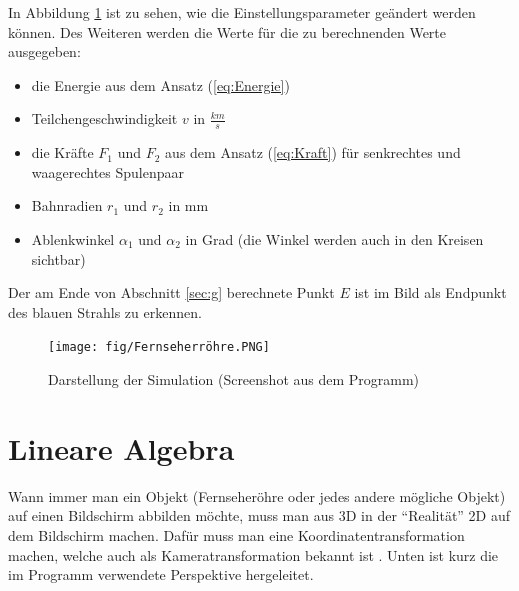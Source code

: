 In Abbildung \ref{fig:meineSimulation} ist zu sehen, wie die Einstellungsparameter geändert werden können. 
Des Weiteren werden die Werte für die zu berechnenden Werte ausgegeben:
\begin{itemize}
    \item die Energie aus dem Ansatz (\ref{eq:Energie})
    \item Teilchengeschwindigkeit $v$ in $\frac{km}{s}$
    \item die Kräfte $F_1$ und $F_2$ aus dem Ansatz (\ref{eq:Kraft}) für senkrechtes und waagerechtes Spulenpaar
    \item Bahnradien $r_1$ und $r_2$ in mm 
    \item Ablenkwinkel $\alpha_1$ und $\alpha_2$ in Grad (die Winkel werden auch in den Kreisen sichtbar)
\end{itemize}
Der am Ende von Abschnitt \ref{sec:g} berechnete Punkt $E$ ist im Bild als Endpunkt des blauen Strahls zu erkennen.

\begin{figure}[h]
    \centering
    \texttt{[image: fig/Fernseherröhre.PNG]}
    \caption{Darstellung der Simulation (Screenshot aus dem Programm)}
    \label{fig:meineSimulation}
\end{figure}

\pagebreak
\section{Lineare Algebra}
Wann immer man ein Objekt (Fernseheröhre oder jedes andere mögliche Objekt) auf einen Bildschirm abbilden möchte, muss man aus 3D in der "`Realität"' 2D auf dem Bildschirm machen. Dafür muss man eine Koordinatentransformation machen, welche auch als Kameratransformation bekannt ist \cite{Kameratransformation}.
Unten ist kurz die im Programm verwendete Perspektive hergeleitet.

